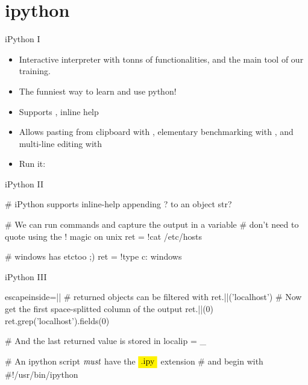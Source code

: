 \section{ipython}



\begin{frame}{iPython I}
\begin{itemize}
\item Interactive interpreter with tonns of                                                                                                        functionalities, and the main tool of our training.                                                                                                      

\item   The funniest way to learn and use python!

\item   Supports , inline help 

\item   Allows pasting from clipboard with  , elementary
    benchmarking with , and multi-line editing with 

\item   Run it: \\
\end{itemize}

\end{frame}


\begin{frame}[fragile]{iPython II}
\begin{pythoncode}
# iPython supports inline-help appending ? to an object
str?

# We can run commands and capture the output in a variable
# don't need to quote using the ! magic on unix
ret = !cat /etc/hosts

# windows has etc\hosts too ;)
ret = !type c: windows\drivers\etc\hosts
\end{pythoncode}
\end{frame}


\begin{frame}[fragile]{iPython III}
\begin{pythoncode*}{escapeinside=||}
# returned objects can be filtered with  
ret.||('localhost')
# Now get the first space-splitted column of the output
ret.||(0)
ret.grep('localhost').fields(0)

# And the last returned value is stored in 
localip = _

# An ipython script $\emph{must}$ have the $\pyver{.ipy}$ extension
#  and begin with #!/usr/bin/ipython 
\end{pythoncode*}
\end{frame}

